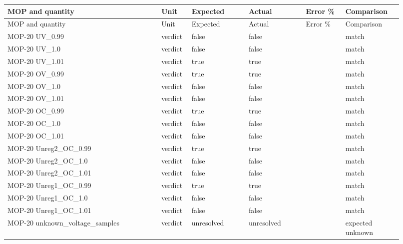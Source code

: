 \begingroup\scriptsize\setlength{\tabcolsep}{2pt}\setlength{\parskip}{0pt}
\begin{longtable}{@{}>{\raggedright\arraybackslash}p{0.3588\linewidth} >{\raggedright\arraybackslash}p{0.0552\linewidth} >{\raggedright\arraybackslash}p{0.138\linewidth} >{\raggedright\arraybackslash}p{0.138\linewidth} >{\raggedright\arraybackslash}p{0.09200000000000001\linewidth} >{\raggedright\arraybackslash}p{0.138\linewidth}@{}}
\toprule
MOP and quantity & Unit & Expected & Actual & Error \% & Comparison \\ \midrule
\endfirsthead
\toprule
MOP and quantity & Unit & Expected & Actual & Error \% & Comparison \\ \midrule
\endhead
\bottomrule\endfoot
MOP-20 UV\_\allowbreak{}0.99 & verdict & false & false &  & match \\
MOP-20 UV\_\allowbreak{}1.0 & verdict & false & false &  & match \\
MOP-20 UV\_\allowbreak{}1.01 & verdict & true & true &  & match \\
MOP-20 OV\_\allowbreak{}0.99 & verdict & true & true &  & match \\
MOP-20 OV\_\allowbreak{}1.0 & verdict & false & false &  & match \\
MOP-20 OV\_\allowbreak{}1.01 & verdict & false & false &  & match \\
MOP-20 OC\_\allowbreak{}0.99 & verdict & true & true &  & match \\
MOP-20 OC\_\allowbreak{}1.0 & verdict & false & false &  & match \\
MOP-20 OC\_\allowbreak{}1.01 & verdict & false & false &  & match \\
MOP-20 Unreg2\_\allowbreak{}OC\_\allowbreak{}0.99 & verdict & true & true &  & match \\
MOP-20 Unreg2\_\allowbreak{}OC\_\allowbreak{}1.0 & verdict & false & false &  & match \\
MOP-20 Unreg2\_\allowbreak{}OC\_\allowbreak{}1.01 & verdict & false & false &  & match \\
MOP-20 Unreg1\_\allowbreak{}OC\_\allowbreak{}0.99 & verdict & true & true &  & match \\
MOP-20 Unreg1\_\allowbreak{}OC\_\allowbreak{}1.0 & verdict & false & false &  & match \\
MOP-20 Unreg1\_\allowbreak{}OC\_\allowbreak{}1.01 & verdict & false & false &  & match \\
MOP-20 unknown\_\allowbreak{}voltage\_\allowbreak{}samples & verdict & unresolved & unresolved &  & expected unknown \\

\end{longtable}
